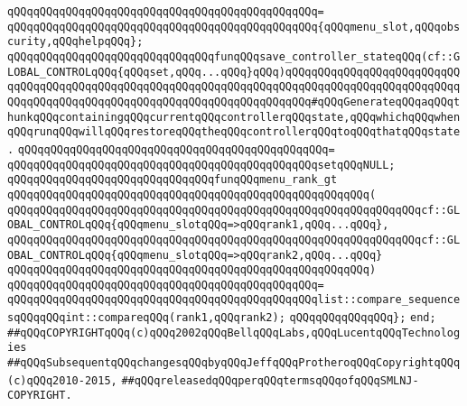 \verb|qQQqqQQqqQQqqQQqqQQqqQQqqQQqqQQqqQQqqQQqqQQqqQQq=|\newline
\verb|qQQqqQQqqQQqqQQqqQQqqQQqqQQqqQQqqQQqqQQqqQQqqQQq{qQQqmenu_slot,qQQqobscurity,qQQqhelpqQQq};|\newline
\newline
\verb|qQQqqQQqqQQqqQQqqQQqqQQqqQQqqQQqfunqQQqsave_controller_stateqQQq(cf::GLOBAL_CONTROLqQQq{qQQqset,qQQq...qQQq}qQQq)qQQqqQQqqQQqqQQqqQQqqQQqqQQqqQQqqQQqqQQqqQQqqQQqqQQqqQQqqQQqqQQqqQQqqQQqqQQqqQQqqQQqqQQqqQQqqQQqqQQqqQQqqQQqqQQqqQQqqQQqqQQqqQQqqQQqqQQqqQQqqQQq#qQQqGenerateqQQqaqQQqthunkqQQqcontainingqQQqcurrentqQQqcontrollerqQQqstate,qQQqwhichqQQqwhenqQQqrunqQQqwillqQQqrestoreqQQqtheqQQqcontrollerqQQqtoqQQqthatqQQqstate.|\newline
\verb|qQQqqQQqqQQqqQQqqQQqqQQqqQQqqQQqqQQqqQQqqQQqqQQq=|\newline
\verb|qQQqqQQqqQQqqQQqqQQqqQQqqQQqqQQqqQQqqQQqqQQqqQQqsetqQQqNULL;|\newline
\newline
\verb|qQQqqQQqqQQqqQQqqQQqqQQqqQQqqQQqfunqQQqmenu_rank_gt|\newline
\verb|qQQqqQQqqQQqqQQqqQQqqQQqqQQqqQQqqQQqqQQqqQQqqQQqqQQqqQQq(|\newline
\verb|qQQqqQQqqQQqqQQqqQQqqQQqqQQqqQQqqQQqqQQqqQQqqQQqqQQqqQQqqQQqqQQqcf::GLOBAL_CONTROLqQQq{qQQqmenu_slotqQQq=>qQQqrank1,qQQq...qQQq},|\newline
\verb|qQQqqQQqqQQqqQQqqQQqqQQqqQQqqQQqqQQqqQQqqQQqqQQqqQQqqQQqqQQqqQQqcf::GLOBAL_CONTROLqQQq{qQQqmenu_slotqQQq=>qQQqrank2,qQQq...qQQq}|\newline
\verb|qQQqqQQqqQQqqQQqqQQqqQQqqQQqqQQqqQQqqQQqqQQqqQQqqQQqqQQq)|\newline
\verb|qQQqqQQqqQQqqQQqqQQqqQQqqQQqqQQqqQQqqQQqqQQqqQQq=|\newline
\verb|qQQqqQQqqQQqqQQqqQQqqQQqqQQqqQQqqQQqqQQqqQQqqQQqlist::compare_sequencesqQQqqQQqint::compareqQQq(rank1,qQQqrank2);|\newline
\newline
\verb|qQQqqQQqqQQqqQQq};|\newline
\verb|end;|\newline
\newline
\verb|##qQQqCOPYRIGHTqQQq(c)qQQq2002qQQqBellqQQqLabs,qQQqLucentqQQqTechnologies|\newline
\verb|##qQQqSubsequentqQQqchangesqQQqbyqQQqJeffqQQqProtheroqQQqCopyrightqQQq(c)qQQq2010-2015,|\newline
\verb|##qQQqreleasedqQQqperqQQqtermsqQQqofqQQqSMLNJ-COPYRIGHT.|\newline

